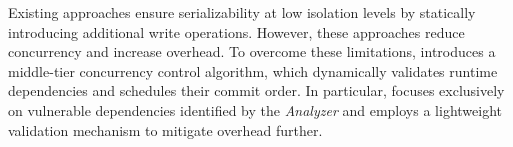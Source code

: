 Existing approaches ensure serializability at low isolation levels by statically introducing additional write operations. However, these approaches reduce concurrency and increase overhead.
To overcome these limitations, \sysname introduces a middle-tier concurrency control algorithm, which dynamically validates runtime dependencies and schedules their commit order. 
In particular, \sysname focuses exclusively on vulnerable dependencies identified by the \textit{Analyzer} and employs a lightweight validation mechanism to mitigate overhead further.



